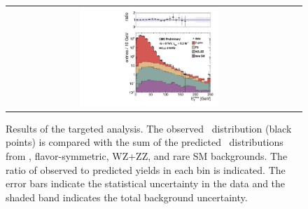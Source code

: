 \begin{figure}[!h]
\begin{center}
\begin{tabular}{cc}
\includegraphics[width=0.5\textwidth]{plots/pfmet_bvetoMedium_all.pdf}
\end{tabular}
\caption{Results of the targeted analysis. The observed \MET\ distribution (black points) is compared with the sum of the predicted \MET\
distributions from \zjets, flavor-symmetric, WZ+ZZ, and rare SM backgrounds. The ratio of observed to predicted yields in each bin is
indicated. The error bars indicate the statistical uncertainty in the data and the shaded band indicates the total background uncertainty.
\label{fig:results_targ}
}
\end{center}
\end{figure}



